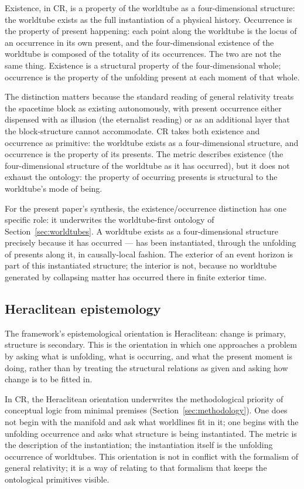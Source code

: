 \documentclass[11pt,a4paper]{article}
\theoremstyle{definition}
\begin{document}
Existence, in CR, is a property of the worldtube as a four-dimensional structure: the worldtube exists as the full instantiation of a physical history. Occurrence is the property of present happening: each point along the worldtube is the locus of an occurrence in its own present, and the four-dimensional existence of the worldtube is composed of the totality of its occurrences. The two are not the same thing. Existence is a structural property of the four-dimensional whole; occurrence is the property of the unfolding present at each moment of that whole.

The distinction matters because the standard reading of general relativity treats the spacetime block as existing autonomously, with present occurrence either dispensed with as illusion (the eternalist reading) or as an additional layer that the block-structure cannot accommodate. CR takes both existence and occurrence as primitive: the worldtube exists as a four-dimensional structure, and occurrence is the property of its presents. The metric describes existence (the four-dimensional structure of the worldtube as it has occurred), but it does not exhaust the ontology: the property of occurring presents is structural to the worldtube's mode of being.

For the present paper's synthesis, the existence/occurrence distinction has one specific role: it underwrites the worldtube-first ontology of Section~\ref{sec:worldtubes}. A worldtube exists as a four-dimensional structure precisely because it has occurred --- has been instantiated, through the unfolding of presents along it, in causally-local fashion. The exterior of an event horizon is part of this instantiated structure; the interior is not, because no worldtube generated by collapsing matter has occurred there in finite exterior time.

\subsection{Heraclitean epistemology}\label{sec:heraclitean}

The framework's epistemological orientation is Heraclitean: change is primary, structure is secondary. This is the orientation in which one approaches a problem by asking what is unfolding, what is occurring, and what the present moment is doing, rather than by treating the structural relations as given and asking how change is to be fitted in.

In CR, the Heraclitean orientation underwrites the methodological priority of conceptual logic from minimal premises (Section~\ref{sec:methodology}). One does not begin with the manifold and ask what worldlines fit in it; one begins with the unfolding occurrence and asks what structure is being instantiated. The metric is the description of the instantiation; the instantiation itself is the unfolding occurrence of worldtubes. This orientation is not in conflict with the formalism of general relativity; it is a way of relating to that formalism that keeps the ontological primitives visible.
\end{document}

